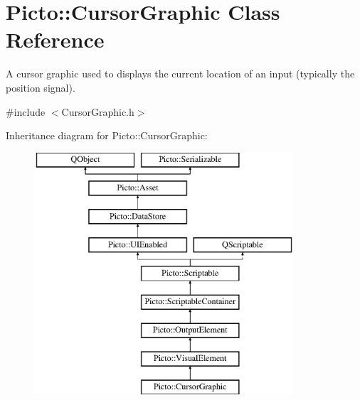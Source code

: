 \hypertarget{class_picto_1_1_cursor_graphic}{\section{Picto\-:\-:Cursor\-Graphic Class Reference}
\label{class_picto_1_1_cursor_graphic}
}


A cursor graphic used to displays the current location of an input (typically the position signal).  




{\ttfamily \#include $<$Cursor\-Graphic.\-h$>$}

Inheritance diagram for Picto\-:\-:Cursor\-Graphic\-:\begin{figure}[H]
\begin{center}
\leavevmode
\includegraphics[height=9.000000cm]{class_picto_1_1_cursor_graphic}
\end{center}
\end{figure}
